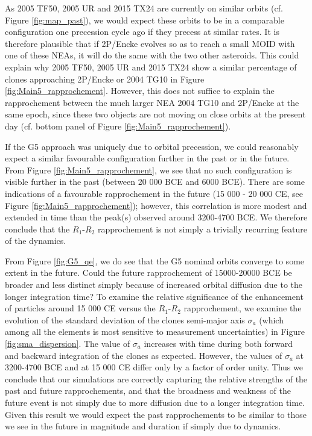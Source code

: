 \documentclass[letters,a4paper,fleqn,usenatbib]{mnras}
\begin{document}
 As 2005 TF50, 2005 UR and 2015 TX24 are currently on similar orbits (cf. Figure \ref{fig:map_past}), we would expect these orbits to be in a comparable configuration one precession cycle ago if they precess at similar rates. It is therefore plausible that if 2P/Encke evolves so as to reach a small MOID with one of these NEAs, it will do the same with the two other asteroids. This could explain why 2005 TF50, 2005 UR and 2015 TX24 show a similar percentage of clones approaching 2P/Encke or 2004 TG10 in Figure \ref{fig:Main5_rapprochement}. However, this does not suffice to explain the rapprochement between the much larger NEA 2004 TG10 and 2P/Encke at the same epoch, since these two objects are not moving on close orbits at the present day (cf. bottom panel of Figure \ref{fig:Main5_rapprochement}).  
 
 If the G5 approach was uniquely due to orbital precession, we could reasonably expect a similar favourable configuration further in the past or in the future. From Figure \ref{fig:Main5_rapprochement}, we see that no such configuration is visible further in the past (between 20 000 BCE and 6000 BCE). There are some indications of a favourable rapprochement in the future (15 000 - 20 000 CE, see Figure \ref{fig:Main5_rapprochement}); however, this correlation is more modest and extended in time than the peak(s) observed around 3200-4700 BCE. We therefore conclude that the $R_1$-$R_2$ rapprochement is not simply a trivially recurring feature of the dynamics. 
 
  From Figure \ref{fig:G5_qe}, we do see that the G5 nominal orbits converge to some extent in the future. Could the future rapprochement of 15000-20000 BCE be broader and less distinct simply because of increased orbital diffusion due to the longer integration time? To examine the relative significance of the enhancement of particles around 15 000 CE versus the $R_1$-$R_2$ rapprochement, we examine the evolution of the standard deviation of the clones semi-major axis $\sigma_a$ (which among all the elements is most sensitive to measurement uncertainties) in Figure \ref{fig:sma_dispersion}. The value of $\sigma_a$ increases with time during both forward and backward integration of the clones as expected. However, the values of $\sigma_a$ at 3200-4700 BCE and at 15 000 CE differ only by a factor of order unity. Thus we conclude that our simulations are correctly capturing the relative strengths of the past and future rapprochements, and that the broadness and weakness of the future event is not simply due to more diffusion due to a longer integration time. Given this result we would expect the past rapprochements to be similar to those we see in the future in magnitude and duration if simply due to dynamics. 
 
\end{document}
